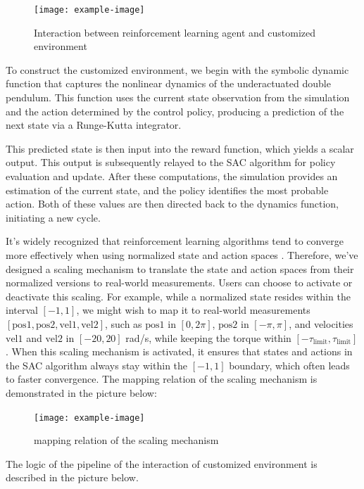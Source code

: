 \begin{figure}[htbp]
    \centering
    \texttt{[image: example-image]}
    \caption{Interaction between reinforcement learning agent and customized environment}
    \label{fig:my_label}
\end{figure}

To construct the customized environment, we begin with the symbolic dynamic function that captures the nonlinear dynamics of the underactuated double pendulum. This function uses the current state observation from the simulation and the action determined by the control policy, producing a prediction of the next state via a Runge-Kutta integrator.

This predicted state is then input into the reward function, which yields a scalar output. This output is subsequently relayed to the SAC algorithm for policy evaluation and update. After these computations, the simulation provides an estimation of the current state, and the policy identifies the most probable action. Both of these values are then directed back to the dynamics function, initiating a new cycle.

It's widely recognized that reinforcement learning algorithms tend to converge more effectively when using normalized state and action spaces \cite{sutton2018reinforcement}. Therefore, we've designed a scaling mechanism to translate the state and action spaces from their normalized versions to real-world measurements. Users can choose to activate or deactivate this scaling. For example, while a normalized state resides within the interval \( [-1,1] \), we might wish to map it to real-world measurements \( \left[ \text{pos1}, \text{pos2}, \text{vel1}, \text{vel2} \right] \), such as \( \text{pos1} \) in \( [0,2\pi] \), \( \text{pos2} \) in \( [-\pi,\pi] \), and velocities \( \text{vel1} \) and \( \text{vel2} \) in \( [-20,20] \) rad/s, while keeping the torque within \( [-\tau_{\text{limit}}, \tau_{\text{limit}}] \). When this scaling mechanism is activated, it ensures that states and actions in the SAC algorithm always stay within the \( [-1,1] \) boundary, which often leads to faster convergence. The mapping relation of the scaling mechanism is demonstrated in the picture below:

\begin{figure}[H]
    \centering
    \texttt{[image: example-image]}
    \caption{mapping relation of the scaling mechanism}
    \label{fig:my_label}
\end{figure}

The logic of the pipeline of the interaction of customized environment is described in the picture below.

